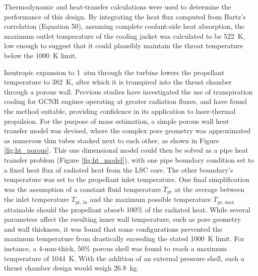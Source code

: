 \documentclass[final,3p,times,twocolumn,sort&compress, lefttitle]{elsarticle}
\begin{document}
                Thermodynamic and heat-transfer calculations were used to determine the performance of this design. By integrating the heat flux computed from Bartz's correlation \cite{bartz_turbulent_1965} (Equation 50), assuming complete coolant-side heat absorption, the maximum outlet temperature of the cooling jacket was calculated to be 522~K, low enough to suggest that it could plausibly maintain the throat temperature below the 1000~K limit.
        
                Isentropic expansion to 1~atm through the turbine lowers the propellant temperature to 382~K, after which it is transpired into the thrust chamber through a porous wall. Previous studies \cite{kascak_nozzle_1971, kramer_transpiration-cooled_1965} have investigated the use of transpiration cooling for GCNR engines operating at greater radiation fluxes, and have found the method suitable, providing confidence in its application to laser-thermal propulsion. For the purpose of mass estimation, a simple porous wall heat transfer model was devised, where the complex pore geometry was approximated as numerous thin tubes stacked next to each other, as shown in Figure \ref{fig:ht_porous}. This one dimensional model could then be solved as a pipe heat transfer problem (Figure \ref{fig:ht_model}), with one pipe boundary condition set to a fixed heat flux of radiated heat from the LSC core. The other boundary's temperature was set to the propellant inlet temperature. One final simplification was the assumption of a constant fluid temperature $\bar{T}_\mathrm{pr}$ at the average between the inlet temperature $T_\text{pr, in}$ and the maximum possible temperature $T_\text{pr, max}$ attainable should the propellant absorb 100\% of the radiated heat. While several parameters affect the resulting inner wall temperature, such as pore geometry and wall thickness, it was found that some configurations prevented the maximum temperature from drastically exceeding the stated 1000~K limit. For instance, a 4-mm-thick, 50\% porous shell was found to reach a maximum temperature of 1044~K. With the addition of an external pressure shell, such a thrust chamber design would weigh 26.8~kg.
                
\end{document}
